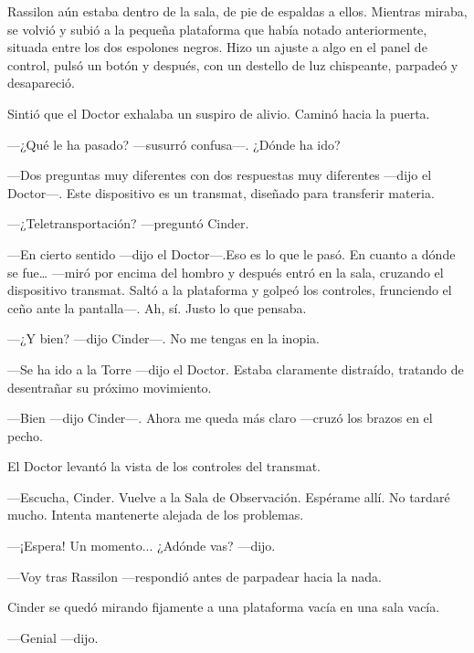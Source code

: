 Rassilon aún estaba dentro de la sala, de pie de espaldas a ellos. Mientras miraba, se volvió y subió a la pequeña plataforma que había notado anteriormente, situada entre los dos espolones negros. Hizo un ajuste a algo en el panel de control, pulsó un botón y después, con un destello de luz chispeante, parpadeó y desapareció. 



Sintió que el Doctor exhalaba un suspiro de alivio. Caminó hacia la puerta. 



—¿Qué le ha pasado? —susurró confusa—. ¿Dónde ha ido? 



—Dos preguntas muy diferentes con dos respuestas muy diferentes —dijo el Doctor—. Este dispositivo es un transmat, diseñado para transferir materia. 



—¿Teletransportación? —preguntó Cinder. 



—En cierto sentido —dijo el Doctor—.Eso es lo que le pasó. En cuanto a dónde se fue… —miró por encima del hombro y después entró en la sala, cruzando el dispositivo transmat. Saltó a la plataforma y golpeó los controles, frunciendo el ceño ante la pantalla—. Ah, sí. Justo lo que pensaba. 



—¿Y bien? —dijo Cinder—. No me tengas en la inopia. 



—Se ha ido a la Torre —dijo el Doctor. Estaba claramente distraído, tratando de desentrañar su próximo movimiento.

 

—Bien —dijo Cinder—. Ahora me queda más claro —cruzó los brazos en el pecho. 



El Doctor levantó la vista de los controles del transmat. 



—Escucha, Cinder. Vuelve a la Sala de Observación. Espérame allí. No tardaré mucho. Intenta mantenerte alejada de los problemas.

 

—¡Espera! Un momento... ¿Adónde vas? —dijo. 



—Voy tras Rassilon —respondió antes de parpadear hacia la nada. 



Cinder se quedó mirando fijamente a una plataforma vacía en una sala vacía. 



—Genial —dijo.
